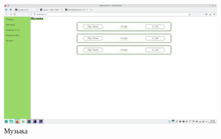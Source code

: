 \begin{figure}[H]
	\centering
	\includegraphics[width=\linewidth]{05}
	\caption{Музыка}
\end{figure}
